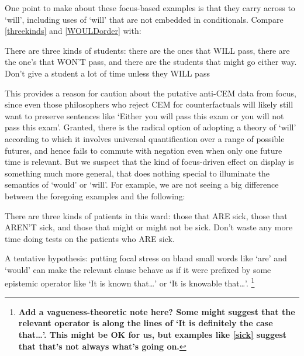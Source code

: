 \documentclass[leqno, 11pt, a5paper, openany]{article}
\begin{document}
One point to make about these focus-based examples is that they carry across to ‘will’, including uses of ‘will’ that are not embedded in conditionals. Compare \ref{threekinds} and \ref{WOULDorder} with:
\begin{prop}
	\nitem
	There are three kinds of students: there are the ones that WILL pass, there are the one's that WON'T pass, and there are the students that might go either way.
	\nitem
	Don't give a student a lot of time unless they WILL pass
\end{prop}
This provides a reason for caution about the putative anti-CEM data from focus, since even those philosophers who reject CEM for counterfactuals will likely still want to preserve sentences like ‘Either you will pass this exam or you will not pass this exam’. Granted, there is the radical option of adopting a theory of ‘will’ according to which it involves universal quantification over a range of possible futures, and hence fails to commute with negation even when only one future time is relevant. But we suspect that the kind of focus-driven effect on display is something much more general, that does nothing special to illuminate the semantics of ‘would’ or ‘will’. For example, we are not seeing a big difference between the foregoing examples and the following:
\begin{prop}
	\nitem \label{sick}
	There are three kinds of patients in this ward: those that ARE sick, those that AREN'T sick, and those that might or might not be sick.
	\nitem
	Don't waste any more time doing tests on the patients who ARE sick.
\end{prop}
A tentative hypothesis: putting focal stress on bland small words like ‘are’ and ‘would’ can make the relevant clause behave as if it were prefixed by some epistemic operator like ‘It is known that\ldots{}’ or ‘It is knowable that\ldots{}’.%
\footnote{\textbf{Add a vagueness-theoretic note here? Some might suggest that the relevant operator is along the lines of ‘It is definitely the case that\ldots{}’. This might be OK for us, but examples like \ref{sick} suggest that that's not always what's going on.}}
\end{document}
